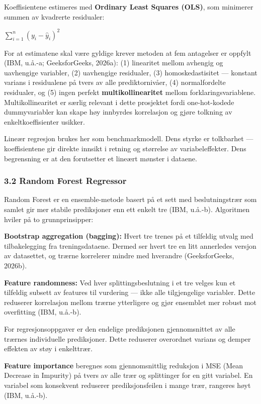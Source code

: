 \documentclass[
  11pt,
]{article}
\begin{document}
Koeffisientene estimeres med \textbf{Ordinary Least Squares (OLS)}, som minimerer summen av kvadrerte residualer:

\(\sum_{i=1}^{n}(y_i - \hat{y}_i)^2\)

For at estimatene skal være gyldige krever metoden at fem antagelser er oppfylt (IBM, u.å.-a; GeeksforGeeks, 2026a): (1)
linearitet mellom avhengig og uavhengige variabler, (2) uavhengige residualer, (3) homoskedastisitet --- konstant
varians i residualene på tvers av alle prediktornivåer, (4) normalfordelte residualer, og (5) ingen perfekt
\textbf{multikollinearitet} mellom forklaringsvariablene. Multikollinearitet er særlig relevant i dette prosjektet fordi
one-hot-kodede dummyvariabler kan skape høy innbyrdes korrelasjon og gjøre tolkning av enkeltkoeffisienter usikker.

Lineær regresjon brukes her som benchmarkmodell. Dens styrke er tolkbarhet --- koeffisientene gir direkte innsikt i
retning og størrelse av variabeleffekter. Dens begrensning er at den forutsetter et lineært mønster i dataene.

\hypertarget{random-forest-regressor}{%
\subsubsection{3.2 Random Forest Regressor}\label{random-forest-regressor}}

Random Forest er en ensemble-metode basert på et sett med beslutningstrær som samlet gir mer stabile prediksjoner enn
ett enkelt tre (IBM, u.å.-b). Algoritmen hviler på to grunnprinsipper:

\textbf{Bootstrap aggregation (bagging):} Hvert tre trenes på et tilfeldig utvalg med tilbakelegging fra
treningsdataene. Dermed ser hvert tre en litt annerledes versjon av datasettet, og trærne korrelerer mindre med
hverandre (GeeksforGeeks, 2026b).

\textbf{Feature randomness:} Ved hver splittingsbeslutning i et tre velges kun et tilfeldig subsett av features til
vurdering --- ikke alle tilgjengelige variabler. Dette reduserer korrelasjon mellom trærne ytterligere og gjør ensemblet
mer robust mot overfitting (IBM, u.å.-b).

For regresjonsoppgaver er den endelige prediksjonen gjennomsnittet av alle trærnes individuelle prediksjoner. Dette
reduserer overordnet varians og demper effekten av støy i enkelttrær.

\textbf{Feature importance} beregnes som gjennomsnittlig reduksjon i MSE (Mean Decrease in Impurity) på tvers av alle
trær og splittinger for en gitt variabel. En variabel som konsekvent reduserer prediksjonsfeilen i mange trær, rangeres
høyt (IBM, u.å.-b).
\end{document}
